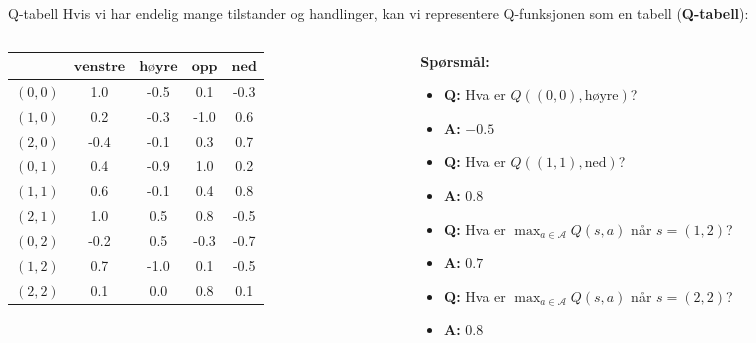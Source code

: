 \documentclass[UKenglish]{beamer}
\begin{document}
\begin{frame}{Q-tabell}
	Hvis vi har endelig mange tilstander og handlinger, kan vi representere Q-funksjonen som en tabell (\textbf{Q-tabell}):
	\begin{columns}
	\begin{column}{0.5\textwidth}
	\begin{table}[!hbt]
	\centering
	\def\arraystretch{1.1}
	\setlength{}
	\begin{tabular}{|c|c|c|c|c|}\hline
			\diagbox{$\textbf{s}$}{$\textbf{a}$} & $\textbf{venstre}$ & $\textbf{høyre}$ & $\textbf{opp}$ & $\textbf{ned}$\\ \hline
			$(0,0)$ & 1.0 & -0.5 & 0.1 & -0.3 \\ \hline
			$(1,0)$ & 0.2 & -0.3 & -1.0 & 0.6 \\ \hline
			$(2,0)$ & -0.4 & -0.1 & 0.3 & 0.7 \\ \hline
			$(0,1)$ & 0.4 & -0.9 & 1.0 & 0.2 \\ \hline
		 	$(1,1)$ & 0.6 & -0.1 & 0.4 & 0.8 \\ \hline
			$(2,1)$ & 1.0 & 0.5 & 0.8 & -0.5 \\ \hline
			$(0,2)$ & -0.2 & 0.5 & -0.3 & -0.7 \\ \hline
			$(1,2)$ & 0.7 & -1.0 & 0.1 & -0.5 \\ \hline
			$(2,2)$ & 0.1 & 0.0 & 0.8 & 0.1 \\ \hline
	\end{tabular}
	\end{table}
	\end{column}
	\begin{column}{0.5\textwidth}%
	
	\textbf{Spørsmål:}
	
	\begin{itemize}
	\item\textbf{Q:} Hva er $Q((0,0), \text{høyre})$?
	\pause
	\item\textbf{A:} $-0.5$
	\pause
	\item\textbf{Q:} Hva er $Q((1,1), \text{ned})$?
	\pause
	\item\textbf{A:} $0.8$
	\pause
	\item\textbf{Q:} Hva er $\max_{a\in\mathcal{A}}Q(s,a)$ når $s=(1,2)$?
	\pause
	\item\textbf{A:} $0.7$
	\pause
	\item\textbf{Q:} Hva er $\max_{a\in\mathcal{A}}Q(s,a)$ når $s=(2,2)$?
	\pause
	\item\textbf{A:} $0.8$
	\end{itemize}
	\end{column}
	\end{columns}
\end{frame}
\end{document}
